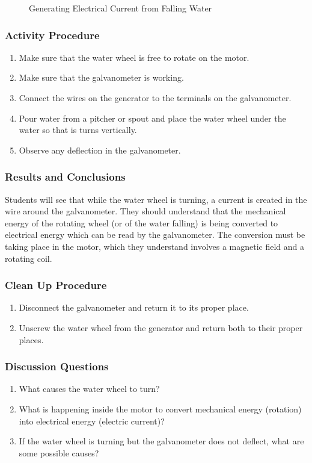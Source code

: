\begin{figure}[h]
\begin{center}
\def\svgwidth{250pt}

\caption{Generating Electrical Current from Falling Water}
\label{fig:water-turbine}
\end{center}
\end{figure}

\subsubsection*{Activity Procedure}
\begin{enumerate}
\item{Make sure that the water wheel is free to rotate on the motor.} 
\item{Make sure that the galvanometer is working.} 
\item{Connect the wires on the generator to the terminals on the galvanometer.} 
\item{Pour water from a pitcher or spout and place the water wheel under the water so that is turns vertically.} 
\item{Observe any deflection in the galvanometer.} 
\end{enumerate}

\subsubsection*{Results and Conclusions}
Students will see that while the water wheel is turning, a current is created in the wire around the galvanometer. They should understand that the mechanical energy of the rotating wheel (or of the water falling) is being converted to electrical energy which can be read by the galvanometer. The conversion must be taking place in the motor, which they understand involves a magnetic field and a rotating coil.  

\subsubsection*{Clean Up Procedure}
\begin{enumerate}
\item{Disconnect the galvanometer and return it to its proper place.} 
\item{Unscrew the water wheel from the generator and return both to their proper places.} 
\end{enumerate}

\subsubsection*{Discussion Questions}
\begin{enumerate}
\item{What causes the water wheel to turn?}
\item{What is happening inside the motor to convert mechanical energy (rotation) into electrical energy (electric current)?}
\item{If the water wheel is turning but the galvanometer does not deflect, what are some possible causes?}
\end{enumerate}

